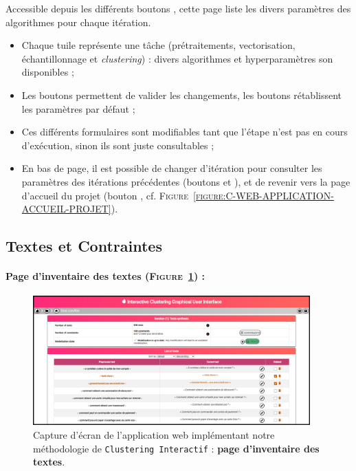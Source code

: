 			Accessible depuis les différents boutons \textguillemets{\faCog}, cette page liste les divers paramètres des algorithmes pour chaque itération.
			\begin{itemize}
				\item Chaque tuile représente une tâche (prétraitements, vectorisation, échantillonnage et \textit{clustering}) : divers algorithmes et hyperparamètres son disponibles ;
				\item Les boutons  permettent de valider les changements, les boutons  rétablissent les paramètres par défaut ;
				\item Ces différents formulaires sont modifiables tant que l'étape n'est pas en cours d'exécution, sinon ils sont juste consultables ;
				\item En bas de page, il est possible de changer d'itération pour consulter les paramètres des itérations précédentes (boutons \textguillemets{\faAngleLeft} et \textguillemets{\faAngleRight}), et de revenir vers la page d'accueil du projet (bouton \textguillemets{\faHome}, cf. \textsc{Figure~\ref{figure:C-WEB-APPLICATION-ACCUEIL-PROJET}}).
			\end{itemize}
	
	
	\newpage
	\subsection{Textes et Contraintes}
	\label{annex:C.2.3-DESCRIPTION-IMPLEMENTATION-INTERACTIVE-CLUSTERING-GUI-DONNEES}
	
		\paragraph{Page d'inventaire des textes (\textsc{Figure~\ref{figure:C-WEB-APPLICATION-INVENTAIRE-TEXTES}}) :}
		
			\begin{figure}[H]
				\centering
				\includegraphics[width=0.95\textwidth]{figures/interactive-clustering-application-textes}
				\caption{
					Capture d'écran de l'application web implémentant notre méthodologie de \texttt{Clustering Interactif} : \textbf{page d'inventaire des textes}.
				}
				\label{figure:C-WEB-APPLICATION-INVENTAIRE-TEXTES}
			\end{figure}
			
